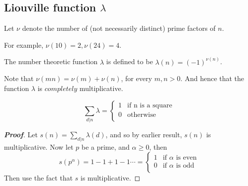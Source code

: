 \subsection{Liouville function $\lambda$}
\begin{definition} Let $\nu$ denote the number of (not necessarily distinct) prime factors of $n$.
\end{definition}
For example, $\nu(10)=2, \nu(24)=4$.
\begin{definition} The number theoretic function $\lambda$ is defined to be $\lambda(n)=(-1)^{\nu(n)}$.
\end{definition}
Note that $\nu(mn)=\nu(m)+\nu(n)$, for every $m,n >0$. And hence that the function $\lambda$ is $completely$ multiplicative.
\begin{lemma}
\begin{equation*}
\sum_{d|n}\lambda= \left\{
\begin{array}{ll}
1 & \text{if n is a square}\\
0 & \text{otherwise } \\
\end{array} \right.
\end{equation*}
\end{lemma}
\begin{proof}[\bf Proof] Let $s(n)=\sum_{d|n}\lambda(d)$, and so by earlier result, $s(n)$ is multiplicative. Now let $p$ be a prime, and $\alpha \ge 0$, then
\begin{equation*}
s(p^\alpha)=1 - 1 + 1 - 1 \cdots= \left\{
\begin{array}{ll}
1 & \text{if } \alpha \text{ is even}\\
0 & \text{if } \alpha \text{ is odd} \\
\end{array} \right.
\end{equation*}
Then use the fact that $s$ is multiplicative.
\end{proof}
